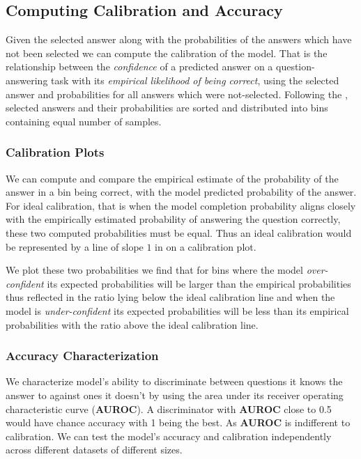 \documentclass[11pt]{article}
\begin{document}
\subsection{Computing Calibration and Accuracy}

Given the selected answer along with the probabilities 
of the answers which have not been selected we can 
compute the calibration of the model.  That is the relationship 
between the \emph{confidence} of a predicted answer on a 
question-answering task with its \emph{empirical likelihood of being correct}, 
using the selected answer and probabilities for all answers which were not-selected. 
Following the \cite{kadavath2022language}, selected answers and their 
probabilities are sorted and distributed into bins containing equal number of samples.

\subsubsection{Calibration Plots}

We can compute and compare the  empirical estimate of the 
probability of the answer in a bin being correct, with the model 
predicted probability of the answer. For ideal calibration, that 
is when the model completion probability aligns closely with the 
empirically estimated probability of answering the question correctly, 
these  two computed probabilities must be equal. 
Thus an ideal calibration would be represented by a line of 
slope $1$ in on a calibration plot.

We plot these two probabilities we find that for bins 
where the model \emph{over-confident} its expected 
probabilities will be larger than the empirical probabilities 
thus reflected in the ratio lying below the ideal calibration 
line and when the model is \emph{under-confident} its 
expected probabilities will be less than its empirical  
probabilities with the ratio above the 
ideal calibration line.

\subsubsection{Accuracy Characterization}

We characterize model's ability to discriminate between questions it 
knows the answer to against ones it doesn't  by using the area under 
its receiver operating characteristic curve (\textbf{AUROC}). 
A discriminator with \textbf{AUROC}  close to 0.5 would have 
chance accuracy with 1 being the best. As \textbf{AUROC} is 
indifferent to calibration. We can test the model's accuracy 
and calibration independently across different datasets of 
different sizes.
\end{document}
